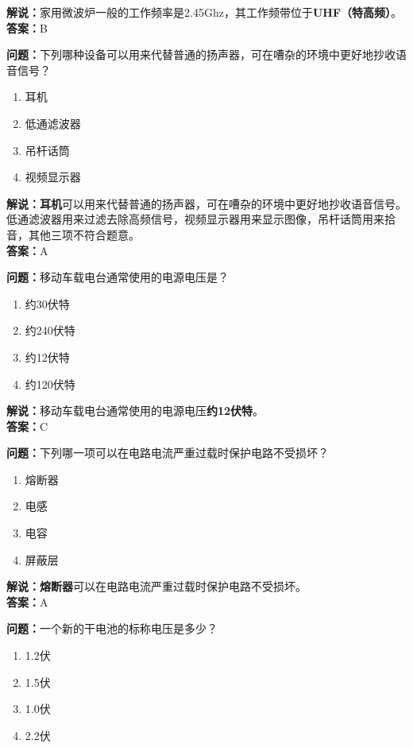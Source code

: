 \textbf{解说：}家用微波炉一般的工作频率是2.45Ghz，其工作频带位于\textbf{UHF（特高频）}。\\\textbf{答案：}B



\textbf{问题：}下列哪种设备可以用来代替普通的扬声器，可在嘈杂的环境中更好地抄收语音信号？

\begin{enumerate}[label=\Alph*), leftmargin=1.5cm]
	\item 耳机
	\item 低通滤波器
	\item 吊杆话筒
	\item 视频显示器
\end{enumerate}

\textbf{解说：耳机}可以用来代替普通的扬声器，可在嘈杂的环境中更好地抄收语音信号。低通滤波器用来过滤去除高频信号，视频显示器用来显示图像，吊杆话筒用来拾音，其他三项不符合题意。\\\textbf{答案：}A


\textbf{问题：}移动车载电台通常使用的电源电压是？

\begin{enumerate}[label=\Alph*), leftmargin=1.5cm]
	\item 约30伏特
	\item 约240伏特
	\item 约12伏特
	\item 约120伏特
\end{enumerate}

\textbf{解说：}移动车载电台通常使用的电源电压\textbf{约12伏特}。\\\textbf{答案：}C


\textbf{问题：}下列哪一项可以在电路电流严重过载时保护电路不受损坏？

\begin{enumerate}[label=\Alph*), leftmargin=1.5cm]
	\item 熔断器
	\item 电感
	\item 电容
	\item 屏蔽层
\end{enumerate}

\textbf{解说：熔断器}可以在电路电流严重过载时保护电路不受损坏。\\\textbf{答案：}A

\textbf{问题：}一个新的干电池的标称电压是多少？

\begin{enumerate}[label=\Alph*), leftmargin=1.5cm]
	\item 1.2伏
	\item 1.5伏
	\item 1.0伏
	\item 2.2伏
\end{enumerate}

